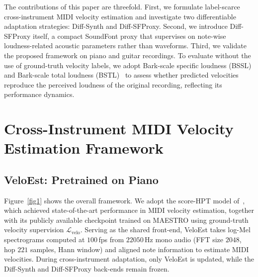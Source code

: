 \documentclass{article}
\begin{document}
The contributions of this paper are threefold. First, we formulate label-scarce cross-instrument MIDI velocity estimation and investigate two differentiable adaptation strategies: Diff-Synth and Diff-SFProxy. Second, we introduce Diff-SFProxy itself, a compact SoundFont proxy that supervises on note-wise loudness-related acoustic parameters rather than waveforms. Third, we validate the proposed framework on piano and guitar recordings. To evaluate without the use of ground-truth velocity labels, we adopt Bark-scale specific loudness (BSSL) and Bark-scale total loudness (BSTL)~\cite{zwicker1999psychoacoustics, he2026dynest} to assess whether predicted velocities reproduce the perceived loudness of the original recording, reflecting its performance dynamics.

\section{Cross-Instrument MIDI Velocity Estimation Framework}
\label{sec:framework}
 
\subsection{VeloEst: Pretrained on Piano}
\label{sec:veloest}
Figure~\ref{fig1} shows the overall framework. We adopt the score-HPT model of~\cite{he2026score}, which achieved state-of-the-art performance in MIDI velocity estimation, together with its publicly available checkpoint trained on MAESTRO using ground-truth velocity supervision $\mathcal{L}_{\mathrm{velo}}$. Serving as the shared front-end, VeloEst takes log-Mel spectrograms computed at $100$\,fps from $22050$\,Hz mono audio (FFT size $2048$, hop $221$ samples, Hann window) and aligned note information to estimate MIDI velocities. During cross-instrument adaptation, only VeloEst is updated, while the Diff-Synth and Diff-SFProxy back-ends remain frozen.
 
\end{document}

